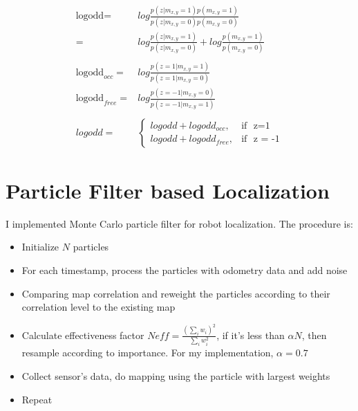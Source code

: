 \documentclass[letterpaper,twocolumn,10pt]{article}
\begin{document}
\begin{align*}
\mbox{logodd} =& log\frac{p(z|m_{x,y}=1)p(m_{x,y}=1)}{p(z|m_{x,y}=0)p(m_{x,y}=0)}\\
=& log\frac{p(z|m_{x,y}=1)}{p(z|m_{x,y}=0)}+log\frac{p(m_{x,y}=1)}{p(m_{x,y}=0)}\\
\\
\mbox{logodd}_{occ}=& log\frac{p(z=1|m_{x,y}=1)}{p(z=1|m_{x,y}=0)}\\
\mbox{logodd}_{free}= & log\frac{p(z=-1|m_{x,y}=0)}{p(z=-1|m_{x,y}=1)}\\
\\
logodd =& \begin{cases} logodd+logodd_{occ}, & \mbox{if } \mbox{ z=1} \\ logodd+logodd_{free}, & \mbox{if } \mbox{ z = -1} \end{cases}  
\end{align*}

\section{Particle Filter based Localization}
I implemented Monte Carlo particle filter for robot localization. The procedure is:
\begin{itemize}
\item Initialize $N$ particles
\item For each timestamp, process the particles with odometry data and add noise
\item Comparing map correlation and reweight the particles according to their correlation level to the existing map
\item Calculate effectiveness factor $Neff = \frac{(\sum_i w_i)^2}{\sum_i w_i^2}$, if it's less than $\alpha N$, then resample according to importance. For my implementation, $\alpha = 0.7$
\item Collect sensor's data, do mapping using the particle with largest weights
\item Repeat
\end{itemize}
\end{document}
